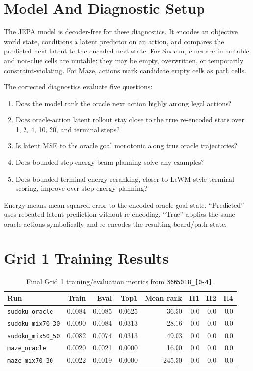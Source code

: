 \documentclass[11pt]{article}
\begin{document}
\section{Model And Diagnostic Setup}

The JEPA model is decoder-free for these diagnostics. It encodes an objective
world state, conditions a latent predictor on an action, and compares the
predicted next latent to the encoded next state. For Sudoku, clues are immutable
and non-clue cells are mutable: they may be empty, overwritten, or temporarily
constraint-violating. For Maze, actions mark candidate empty cells as path cells.

The corrected diagnostics evaluate five questions:

\begin{enumerate}
  \item Does the model rank the oracle next action highly among legal actions?
  \item Does oracle-action latent rollout stay close to the true re-encoded
        state over 1, 2, 4, 10, 20, and terminal steps?
  \item Is latent MSE to the oracle goal monotonic along true oracle
        trajectories?
  \item Does bounded step-energy beam planning solve any examples?
  \item Does bounded terminal-energy reranking, closer to LeWM-style terminal
        scoring, improve over step-energy planning?
\end{enumerate}

Energy means mean squared error to the encoded oracle goal state. ``Predicted''
uses repeated latent prediction without re-encoding. ``True'' applies the same
oracle actions symbolically and re-encodes the resulting board/path state.

\section{Grid 1 Training Results}

\begin{table}[H]
\centering
\small
\begin{tabular}{lrrrrrrr}
\toprule
Run & Train & Eval & Top1 & Mean rank & H1 & H2 & H4 \\
\midrule
\texttt{sudoku\_oracle} & 0.0084 & 0.0085 & 0.0625 & 36.50 & 0.0 & 0.0 & 0.0 \\
\texttt{sudoku\_mix70\_30} & 0.0090 & 0.0084 & 0.0313 & 28.16 & 0.0 & 0.0 & 0.0 \\
\texttt{sudoku\_mix50\_50} & 0.0082 & 0.0074 & 0.0313 & 49.03 & 0.0 & 0.0 & 0.0 \\
\texttt{maze\_oracle} & 0.0020 & 0.0021 & 0.0000 & 16.00 & 0.0 & 0.0 & 0.0 \\
\texttt{maze\_mix70\_30} & 0.0022 & 0.0019 & 0.0000 & 245.50 & 0.0 & 0.0 & 0.0 \\
\bottomrule
\end{tabular}
\caption{Final Grid 1 training/evaluation metrics from \texttt{3665018\_[0-4]}.}
\end{table}
\end{document}
